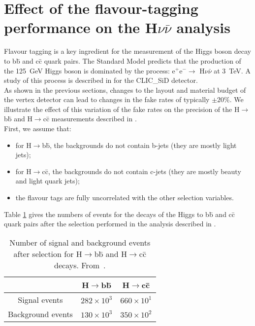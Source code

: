 \section{Effect of the flavour-tagging performance on the H$\nu \bar{\nu}$ analysis}\label{sec:impactOfMaterialBudget}

Flavour tagging is a key ingredient for the measurement of the Higgs boson decay to b\={b} and c\={c} quark pairs. The Standard Model predicts that the production of the 125~GeV Higgs boson is dominated by the process: e$^+$e$^- \rightarrow$ H$\nu \bar{\nu}$ at 3~TeV. A study of this process is described in \cite{Lastovicka:1499128} for the CLIC\_SiD detector. \\
As shown in the previous sections, changes to the layout and material budget of the vertex detector can lead to changes in the fake rates of typically $\pm 20 \%$. We illustrate the effect of this variation of the fake rates on the precision of the H$\rightarrow$b\={b} and H$\rightarrow$c\={c} measurements described in \cite{Lastovicka:1499128}. \\
First, we assume that:
\begin{itemize}
\item for H$\rightarrow$b\={b}, the backgrounds do not contain b-jets (they are mostly light jets);
\item for H$\rightarrow$c\={c}, the backgrounds do not contain c-jets (they are mostly beauty and light quark jets);
\item the flavour tags are fully uncorrelated with the other selection variables. 
\end{itemize}

Table \ref{tab:HBBCC} gives the numbers of events for the decays of the Higgs to b\={b} and c\={c} quark pairs after the selection performed in the analysis described in \cite{Lastovicka:1499128}.
\begin{table}[H]
  \begin{center}
    \begin{tabular}{c c c}
      \hline
      & H$\rightarrow$b\={b} & H$\rightarrow$c\={c} \\ \hline\hline
      Signal events & $282 \times 10^3$ & $660 \times 10^1$ \\
      Background events & $130 \times 10^3$ & $350 \times 10^2$ \\
      \hline
    \end{tabular}
  \end{center}
  \caption{Number of signal and background events after selection for H$\rightarrow$b\={b} and H$\rightarrow$c\={c} decays. From~\cite{Lastovicka:1499128}.}\label{tab:HBBCC}
\end{table}

